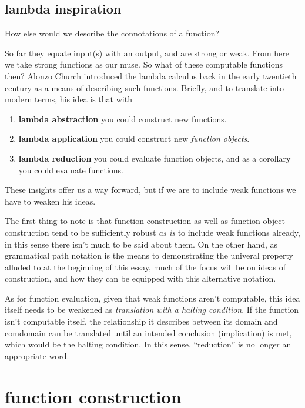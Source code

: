 \documentclass[twoside]{article}
\begin{document}
\subsection*{lambda inspiration}

How else would we describe the connotations of a function?

So far they equate input(s) with an output, and are strong or weak. From here we take strong functions as our muse.
So what of these computable functions then? Alonzo Church introduced the lambda calculus back in the early twentieth
century as a means of describing such functions. Briefly, and to translate into modern terms, his idea is that with

\begin{enumerate}
\item {\bfseries lambda abstraction} you could construct new functions.
\item {\bfseries lambda application} you could construct new \emph{function objects}.
\item {\bfseries lambda reduction} you could evaluate function objects, and as a corollary you could evaluate functions.
\end{enumerate}
These insights offer us a way forward, but if we are to include weak functions we have to weaken his ideas.

The first thing to note is that function construction as well as function object construction tend to be sufficiently
robust \emph{as is} to include weak functions already, in this sense there isn't much to be said about them. On the other
hand, as grammatical path notation is the means to demonstrating the univeral property alluded to at the beginning of this
essay, much of the focus will be on ideas of construction, and how they can be equipped with this alternative notation.

As for function evaluation, given that weak functions aren't computable, this idea itself needs to be weakened
as \emph{translation with a halting condition}. If the function isn't computable itself, the relationship
it describes between its domain and comdomain can be translated until an intended conclusion (implication)
is met, which would be the halting condition. In this sense, ``reduction'' is no longer an appropriate word.

\section*{function construction}
\end{document}
